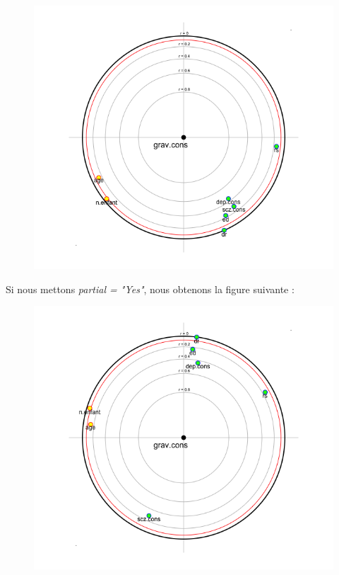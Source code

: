 \begin{figure}[H]\begin{center}\includegraphics[scale=0.5]{ilu/ACPFNo.png}\end{center}\end{figure}

Si nous mettons \textit{partial = "Yes"}, nous obtenons la figure suivante : 

\begin{figure}[H]\begin{center}\includegraphics[scale=0.5]{ilu/ACPFYes.png}\end{center}\end{figure}

